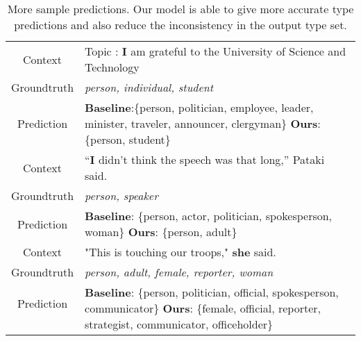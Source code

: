 \documentclass[11pt,a4paper]{article}
\begin{document}
\begin{table*}[t]
\begin{tabular}{c|l}
        
        Context & \multirow{1}{13cm}{Topic : \textbf{I} am grateful to the University of Science and Technology}\\
        Groundtruth & \textit{person, individual, student} \\ 
        Prediction & \textbf{Baseline}:\{person, politician, employee, leader, minister, traveler, announcer, clergyman\} \textbf{Ours}:\{person, student\}\\ \midrule
        
  

        Context & \multirow{1}{13cm}{``\textbf{I} didn't think the speech was that long,'' Pataki said.} \\
        Groundtruth & \textit{person, speaker} \\
        Prediction & \textbf{Baseline}: \{person, actor, politician, spokesperson, woman\} \textbf{Ours}: \{person, adult\} \\ \midrule
        
        Context &  "This is touching our troops," \textbf{she} said.\\
        Groundtruth & \textit{person, adult, female, reporter, woman}\\
        Prediction & \multirow{2}{13cm}{\textbf{Baseline}: \{person, politician, official, spokesperson, communicator\} \textbf{Ours}: \{female, official, reporter, strategist, communicator, officeholder\}}\\ & \\

        \bottomrule
    \end{tabular}
    \caption{More sample predictions. Our model is able to give more accurate type predictions and also reduce the inconsistency in the output type set.}
    \label{tab:more_analysis}
\end{table*}
\end{document}
